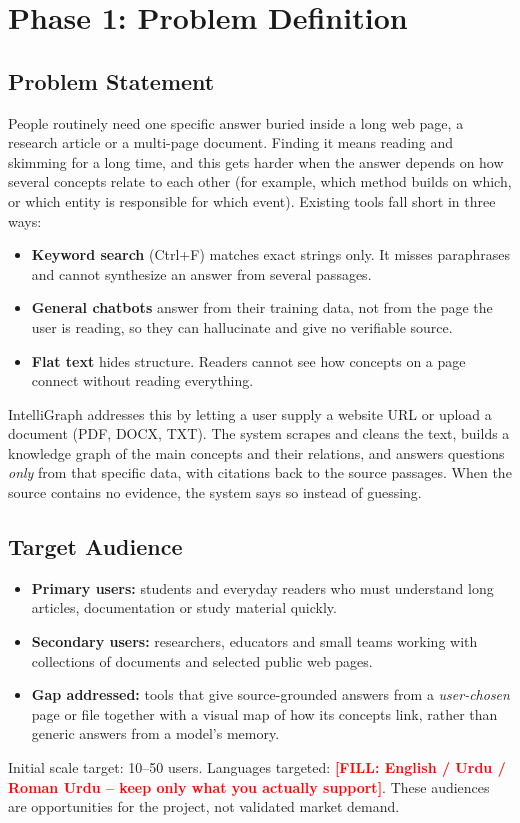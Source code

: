 \documentclass[11pt,a4paper]{article}
\newcommand{\todo}[1]{\textcolor{red}{\textbf{[FILL: #1]}}}
\begin{document}
\tableofcontents
\newpage

\section{Phase 1: Problem Definition}

\subsection{Problem Statement}
People routinely need one specific answer buried inside a long web page, a research article or a multi-page document. Finding it means reading and skimming for a long time, and this gets harder when the answer depends on how several concepts relate to each other (for example, which method builds on which, or which entity is responsible for which event). Existing tools fall short in three ways:
\begin{itemize}[nosep]
  \item \textbf{Keyword search} (Ctrl+F) matches exact strings only. It misses paraphrases and cannot synthesize an answer from several passages.
  \item \textbf{General chatbots} answer from their training data, not from the page the user is reading, so they can hallucinate and give no verifiable source.
  \item \textbf{Flat text} hides structure. Readers cannot see how concepts on a page connect without reading everything.
\end{itemize}
IntelliGraph addresses this by letting a user supply a website URL or upload a document (PDF, DOCX, TXT). The system scrapes and cleans the text, builds a knowledge graph of the main concepts and their relations, and answers questions \emph{only} from that specific data, with citations back to the source passages. When the source contains no evidence, the system says so instead of guessing.

\subsection{Target Audience}
\begin{itemize}[nosep]
  \item \textbf{Primary users:} students and everyday readers who must understand long articles, documentation or study material quickly.
  \item \textbf{Secondary users:} researchers, educators and small teams working with collections of documents and selected public web pages.
  \item \textbf{Gap addressed:} tools that give source-grounded answers from a \emph{user-chosen} page or file together with a visual map of how its concepts link, rather than generic answers from a model's memory.
\end{itemize}
Initial scale target: 10--50 users. Languages targeted: \todo{English / Urdu / Roman Urdu -- keep only what you actually support}. These audiences are opportunities for the project, not validated market demand.
\end{document}
